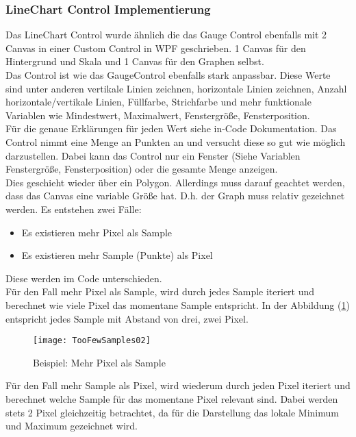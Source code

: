 \subsubsection{LineChart Control Implementierung}
Das LineChart Control wurde ähnlich die das Gauge Control ebenfalls mit 2 Canvas in einer Custom Control in WPF geschrieben. 1 Canvas für den Hintergrund und Skala und 1 Canvas für den Graphen selbst.\\
Das Control ist wie das GaugeControl ebenfalls stark anpassbar. Diese Werte sind unter anderen vertikale Linien zeichnen, horizontale Linien zeichnen, Anzahl horizontale/vertikale Linien, Füllfarbe, Strichfarbe und mehr funktionale Variablen wie Mindestwert, Maximalwert, Fenstergröße, Fensterposition.\\
Für die genaue Erklärungen für jeden Wert siehe in-Code Dokumentation.
Das Control nimmt eine Menge an Punkten an und versucht diese so gut wie möglich darzustellen. Dabei kann das Control nur ein Fenster (Siehe Variablen Fenstergröße, Fensterposition) oder die gesamte Menge anzeigen.\\
Dies geschieht wieder über ein Polygon. Allerdings muss darauf geachtet werden, dass das Canvas eine variable Größe hat. D.h. der Graph muss relativ gezeichnet werden. Es entstehen zwei Fälle:\\
\begin{itemize}
	\item Es existieren mehr Pixel als Sample
	\item Es existieren mehr Sample (Punkte) als Pixel
\end{itemize}
Diese werden im Code unterschieden.\\
\newpage
Für den Fall mehr Pixel als Sample, wird durch jedes Sample iteriert und berechnet wie viele Pixel das momentane Sample entspricht. In der Abbildung (\ref{fig:diagram2}) entspricht jedes Sample mit Abstand von drei, zwei Pixel.\\
\begin{figure}[ht]
	\centering
	\texttt{[image: TooFewSamples02]}
	\caption{Beispiel: Mehr Pixel als Sample}
	\label{fig:diagram2}
\end{figure}

Für den Fall mehr Sample als Pixel, wird wiederum durch jeden Pixel iteriert und berechnet welche Sample für das momentane Pixel relevant sind. Dabei werden stets 2 Pixel gleichzeitig betrachtet, da für die Darstellung das lokale Minimum und Maximum gezeichnet wird.\\

